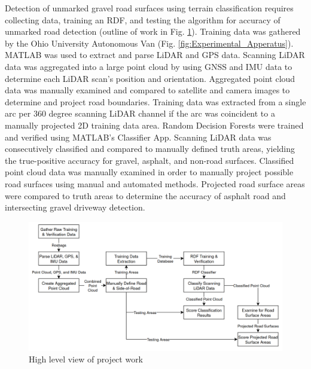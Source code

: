 \documentclass[journal,onecolumn]{IEEEtran}
\begin{document}
%		

		{Detection of unmarked gravel road surfaces using terrain classification requires collecting data, training an RDF, and testing the algorithm for accuracy of unmarked road detection (outline of work in Fig. \ref{fig:flowz_8}). Training data was gathered by the Ohio University Autonomous Van (Fig. \ref{fig:Experimental_Apperatus}). MATLAB was used to extract and parse LiDAR and GPS data. Scanning LiDAR data was aggregated into a large point cloud by using GNSS and IMU data to determine each LiDAR scan's position and orientation. Aggregated point cloud data was manually examined and compared to satellite and camera images to determine and project road boundaries. Training data was extracted from a single arc per 360 degree scanning LiDAR channel if the arc was coincident to a manually projected 2D training data area. Random Decision Forests were trained and verified using MATLAB's Classifier App. Scanning LiDAR data was consecutively classified and compared to manually defined truth areas, yielding the true-positive accuracy for gravel, asphalt, and non-road surfaces. Classified point cloud data was manually examined in order to manually project possible road surfaces using manual and automated methods. Projected road surface areas were compared to truth areas to determine the accuracy of asphalt road and intersecting gravel driveway detection.}

			\begin{figure}[H]
				\centering
				\includegraphics[width=0.9\linewidth]{figures/flowz_8}
				\caption[Project Flow]{High level view of project work}
				\label{fig:flowz_8}
			\end{figure}	
\end{document}
